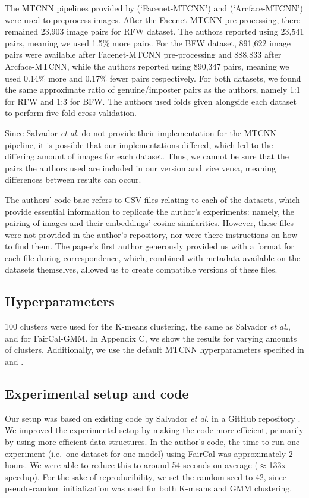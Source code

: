 The MTCNN pipelines provided by \citep{facenetpytorch} (`Facenet-MTCNN') and \citep{arcface} (`Arcface-MTCNN') were used to preprocess images. After the Facenet-MTCNN pre-processing, there remained 23,903 image pairs for RFW dataset. The authors reported using 23,541 pairs, meaning we used 1.5\% more pairs. For the BFW dataset, 891,622 image pairs were available after Facenet-MTCNN pre-processing and 888,833 after Arcface-MTCNN, while the authors reported using 890,347 pairs, meaning we used 0.14\% more and 0.17\% fewer pairs respectively. For both datasets, we found the same approximate ratio of genuine/imposter pairs as the authors, namely 1:1 for RFW and 1:3 for BFW. The authors used folds given alongside each dataset to perform five-fold cross validation. 

Since Salvador \textit{et al.} do not provide their implementation for the MTCNN pipeline, it is possible that our implementations differed, which led to the differing amount of images for each dataset. Thus, we cannot be sure that the pairs the authors used are included in our version and vice versa, meaning differences between results can occur. 

The authors' code base refers to CSV files relating to each of the datasets, which provide essential information to replicate the author's experiments: namely, the pairing of images and their embeddings' cosine similarities. However, these files were not provided in the author's repository, nor were there instructions on how to find them. The paper's first author generously provided us with a format for each file during correspondence, which, combined with metadata available on the datasets themselves, allowed us to create compatible versions of these files. 

\subsection{Hyperparameters}
100 clusters were used for the K-means clustering, the same as Salvador \textit{et al.}, and for FairCal-GMM. In Appendix C, we show the results for varying amounts of clusters. Additionally, we use the default MTCNN hyperparameters specified in \citep{facenetpytorch} and \citep{arcface}.

\subsection{Experimental setup and code}
Our setup was based on existing code by Salvador \textit{et al.} in a GitHub repository \citep{faircalgithub}. We improved the experimental setup by making the code more efficient, primarily by using more efficient data structures. In the author's code, the time to run one experiment (i.e.\ one dataset for one model) using FairCal was approximately 2 hours. We were able to reduce this to around 54 seconds on average ($\approx$133x speedup). For the sake of reproducibility, we set the random seed to 42, since pseudo-random initialization was used for both K-means and GMM clustering. 

